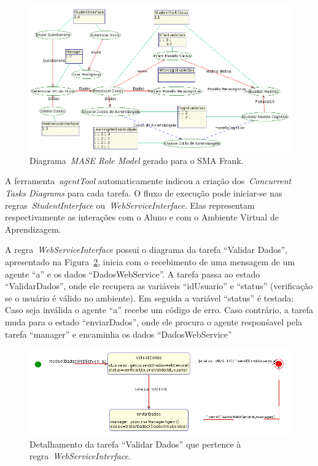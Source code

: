 \begin{figure}
	\centering
	\includegraphics[scale=0.48]{images/mase-role-model.png}
	\caption{Diagrama~\emph{MASE Role Model} gerado para o SMA Frank.}
	\label{fig:frank-role-model}
\end{figure}

A ferramenta~\emph{agentTool} automaticamente indicou a criação dos~\emph{Concurrent Tasks Diagrams} para cada tarefa. O fluxo de execução pode iniciar-se nas regras~\emph{StudentInterface} ou~\emph{WebServiceInterface}. Elas representam respectivamente as interações com o Aluno e com o Ambiente Virtual de Aprendizagem.

A regra~\emph{WebServiceInterface} possui o diagrama da tarefa ``Validar Dados'', apresentado na Figura~\ref{fig:validar-dados}, inicia com o recebimento de uma mensagem de um agente ``a'' e os dados ``DadosWebService''. A tarefa passa ao estado ``ValidarDados'', onde ele recupera as variáveis ``idUsuario'' e ``status'' (verificação se o usuário é válido no ambiente). Em seguida a variável ``status'' é testada: Caso seja inválida o agente ``a'' recebe um código de erro. Caso contrário, a tarefa muda para o estado ``enviarDados'', onde ele procura o agente responśavel pela tarefa ``manager'' e encaminha os dados ``DadosWebService''
 
\begin{figure}
	\centering
	\includegraphics[scale=0.48]{images/td-validar-dados.png}
	\caption{Detalhamento da tarefa ``Validar Dados'' que pertence à regra~\emph{WebServiceInterface}.}
	\label{fig:validar-dados}
\end{figure}

